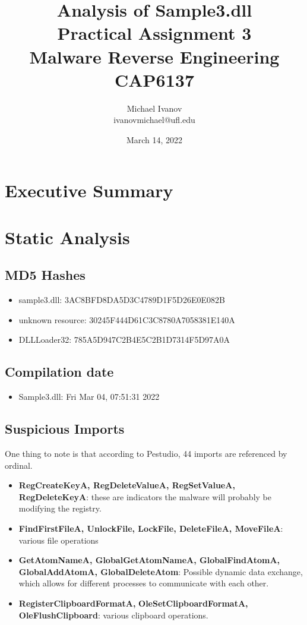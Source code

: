 \documentclass{article}
\title{Analysis of Sample3.dll \\Practical Assignment 3\\Malware Reverse Engineering \\
CAP6137}
\author{Michael Ivanov \\
ivanovmichael@ufl.edu}
\date{March 14, 2022}
\begin{document}
    \maketitle
    \pagebreak
    \section{Executive Summary}
    \pagebreak
    \section{Static Analysis}
    \subsection{MD5 Hashes}
    \begin{itemize}
        \item sample3.dll: 3AC8BFD8DA5D3C4789D1F5D26E0E082B
        \item unknown resource: 30245F444D61C3C8780A7058381E140A
        \item DLLLoader32: 785A5D947C2B4E5C2B1D7314F5D97A0A
    \end{itemize}
    \subsection{Compilation date}
    \begin{itemize}
        \item Sample3.dll: Fri Mar 04, 07:51:31 2022
    \end{itemize}
    \subsection{Suspicious Imports}
    One thing to note is that according to Pestudio, 44 imports are referenced by ordinal.
    \begin{itemize}
        \item \textbf{RegCreateKeyA, RegDeleteValueA, RegSetValueA, RegDeleteKeyA}: these are indicators the malware will probably be modifying the registry.
        \item \textbf{FindFirstFileA, UnlockFile, LockFile, DeleteFileA, MoveFileA}: various file operations
        \item \textbf{GetAtomNameA, GlobalGetAtomNameA, GlobalFindAtomA, GlobalAddAtomA, GlobalDeleteAtom}: Possible dynamic data exchange, which allows for different processes to communicate with each other. \cite{atom}
        \item \textbf{RegisterClipboardFormatA,} \textbf{OleSetClipboardFormatA,} \textbf{OleFlushClipboard}: various clipboard operations.
    \end{itemize}
\end{document}
